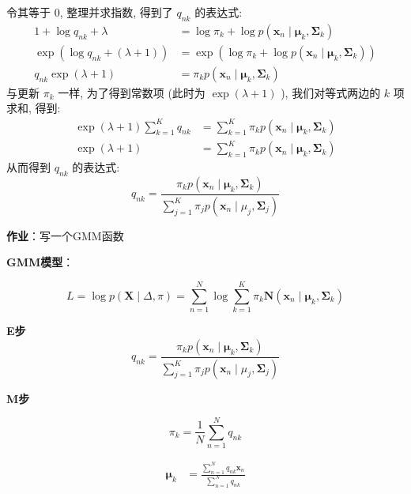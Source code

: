 \documentclass[UTF8]{ctexart}
\numberwithin{equation}{section}
\begin{document}
令其等于 0, 整理并求指数, 得到了 $q_{n k}$ 的表达式:
$$
\begin{aligned}
1+\log q_{n k}+\lambda &=\log \pi_{k}+\log p\left(\boldsymbol{x}_{n} \mid \boldsymbol{\mu}_{k}, \boldsymbol{\Sigma}_{k}\right) \\
\exp \left(\log q_{nk}+(\lambda+1)\right) &=\exp \left(\log \pi_{k}+\log p\left(\boldsymbol{x}_{n} \mid \boldsymbol{\mu}_{k}, \boldsymbol{\Sigma}_{k}\right)\right) \\
q_{nk} \exp (\lambda+1) &=\pi_{k} p\left(\boldsymbol{x}_{n} \mid \boldsymbol{\mu}_{k}, \boldsymbol{\Sigma}_{k}\right)
\end{aligned}
$$
与更新 $\pi_{k}$ 一样, 为了得到常数项 (此时为 $\exp (\lambda+1)$ ), 我们对等式两边的 $k$ 项求和, 得到:
$$
\begin{aligned}
\exp (\lambda+1) \sum_{k=1}^{K} q_{n k} &=\sum_{k=1}^{K} \pi_{k} p\left(\boldsymbol{x}_{n} \mid \boldsymbol{\mu}_{k}, \boldsymbol{\Sigma}_{k}\right) \\
\exp (\lambda+1) &=\sum_{k=1}^{K} \pi_{k} p\left(\boldsymbol{x}_{n} \mid \boldsymbol{\mu}_{k}, \boldsymbol{\Sigma}_{k}\right)
\end{aligned}
$$
从而得到 $q_{nk}$ 的表达式:
$$
q_{n k}=\frac{\pi_{k} p\left(\boldsymbol{x}_{n} \mid \boldsymbol{\mu}_{k}, \boldsymbol{\Sigma}_{k}\right)}{\sum_{j=1}^{K} \pi_{j} p\left(\boldsymbol{x}_{n} \mid \mu_{j}, \boldsymbol{\Sigma}_{j}\right)}
$$

\newpage
\textbf{作业}：写一个GMM函数

\textbf{GMM模型}：

\begin{equation}
L=\log p(\boldsymbol{X} \mid \Delta, \pi)=\sum_{n=1}^{N} \log \sum_{k=1}^{K} \pi_{k} \boldsymbol{N}\left(\boldsymbol{x}_{n} \mid \boldsymbol{\mu}_{k}, \boldsymbol{\Sigma}_{k}\right) 
\end{equation}

\textbf{E步}
$$
q_{n k}=\frac{\pi_{k} p\left(\boldsymbol{x}_{n} \mid \boldsymbol{\mu}_{k}, \boldsymbol{\Sigma}_{k}\right)}{\sum_{j=1}^{K} \pi_{j} p\left(\boldsymbol{x}_{n} \mid \mu_{j}, \boldsymbol{\Sigma}_{j}\right)}
$$

\textbf{M步}

\begin{equation}
    \pi_{k}=\frac{1}{N} \sum_{n=1}^{N} q_{n k}
\end{equation}

$$
\begin{aligned}
\boldsymbol{\mu}_{k} &=\frac{\sum_{n=1}^{N} q_{n k} \boldsymbol{x}_{n}}{\sum_{n=1}^{N} q_{n k}}
\end{aligned}
$$
\end{document}

